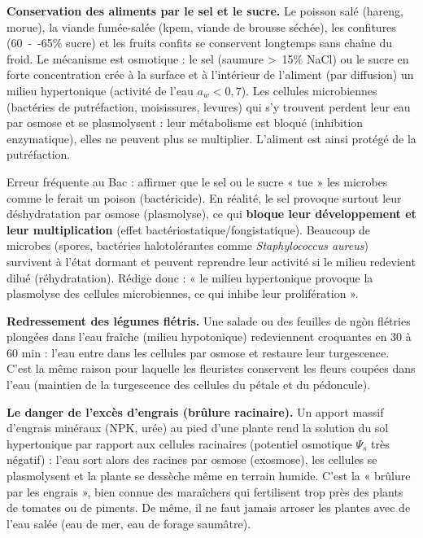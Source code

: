 \documentclass[11pt]{article}
\newcommand{\cle}[1]{{\popxbold\color{popdark}#1}}
\newcounter{popsec}
\newcounter{popsub}
\newcommand{\courssub}[1]{%
  \stepcounter{popsub}%
  \par\vspace{9pt}\noindent{\popxbold\fontsize{11.5}{13}\selectfont\color{popink}{\color{poporange}\thepopsec.\thepopsub}\hspace{6pt}#1}\par\nopagebreak\vspace{4pt}
}
\begin{document}
\courssub{Applications alimentaires et domestiques}

\textbf{Conservation des aliments par le sel et le sucre.} Le poisson salé (hareng, morue), la viande fumée-salée (kpem, viande de brousse séchée), les confitures (\SI{60}{--}{65}{\%} sucre) et les fruits confits se conservent longtemps sans chaîne du froid. Le mécanisme est osmotique : le sel (saumure \SI{>}{15}{\%} NaCl) ou le sucre en forte concentration crée à la surface et à l'intérieur de l'aliment (par diffusion) un milieu \cle{hypertonique} (activité de l'eau $a_w < 0,7$). Les cellules microbiennes (bactéries de putréfaction, moisissures, levures) qui s'y trouvent perdent leur eau par osmose et se \cle{plasmolysent} : leur métabolisme est bloqué (inhibition enzymatique), elles ne peuvent plus se multiplier. L'aliment est ainsi protégé de la putréfaction.

\begin{attention}
Erreur fréquente au Bac : affirmer que le sel ou le sucre « tue » les microbes comme le ferait un poison (bactéricide). En réalité, le sel provoque surtout leur \cle{déshydratation par osmose} (plasmolyse), ce qui \textbf{bloque leur développement et leur multiplication} (effet bactériostatique/fongistatique). Beaucoup de microbes (spores, bactéries halotolérantes comme \emph{Staphylococcus aureus}) survivent à l'état dormant et peuvent reprendre leur activité si le milieu redevient dilué (réhydratation). Rédige donc : « le milieu hypertonique provoque la plasmolyse des cellules microbiennes, ce qui inhibe leur prolifération ».
\end{attention}

\textbf{Redressement des légumes flétris.} Une salade ou des feuilles de ngòn flétries plongées dans l'eau fraîche (milieu hypotonique) redeviennent croquantes en 30 à 60 min : l'eau entre dans les cellules par osmose et restaure leur \cle{turgescence}. C'est la même raison pour laquelle les fleuristes conservent les fleurs coupées dans l'eau (maintien de la turgescence des cellules du pétale et du pédoncule).

\textbf{Le danger de l'excès d'engrais (brûlure racinaire).} Un apport massif d'engrais minéraux (NPK, urée) au pied d'une plante rend la solution du sol \cle{hypertonique} par rapport aux cellules racinaires (potentiel osmotique $\Psi_s$ très négatif) : l'eau sort alors des racines par osmose (exosmose), les cellules se plasmolysent et la plante se dessèche même en terrain humide. C'est la « \cle{brûlure par les engrais} », bien connue des maraîchers qui fertilisent trop près des plants de tomates ou de piments. De même, il ne faut jamais arroser les plantes avec de l'eau salée (eau de mer, eau de forage saumâtre).
\end{document}
